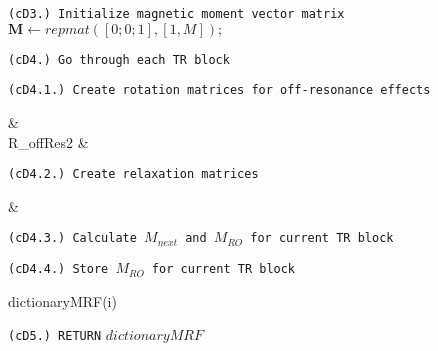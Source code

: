 \begin{algorithm}
    \LinesNumberedHidden

    \nonl \texttt{(cD3.) Initialize magnetic moment vector matrix} \\
    \nonl $\bm{M} \gets repmat([0; 0; 1], [1,M]);$

    \nonl \texttt{(cD4.) Go through each TR block} \\
    \nonl {} {
        \nonl \texttt{(cD4.1.) Create rotation matrices for off-resonance effects}
        \begin{flalign*}
             &\gets {} \\
            R_{offRes2} &\gets {} 
        \end{flalign*}
        
        \nonl \texttt{(cD4.2.) Create relaxation matrices}
        \begin{flalign*}
            [D, D_z] &\gets {}
        \end{flalign*}
        
        \nonl \texttt{(cD4.3.) Calculate $M_{next}$ and $M_{RO}$ for current TR block}
        \begin{flalign*}
            [\bm{M, M_{RO}}] \gets {}
        \end{flalign*}
        
        \nonl \texttt{(cD4.4.) Store $M_{RO}$ for current TR block}
        \begin{flalign*}
            dictionaryMRF(i) \gets {}
        \end{flalign*}
    \nonl }

    \nonl \texttt{(cD5.) RETURN} $dictionaryMRF$ \;    
    
    \fontsize{8pt}{8pt}\selectfont
\end{algorithm}

